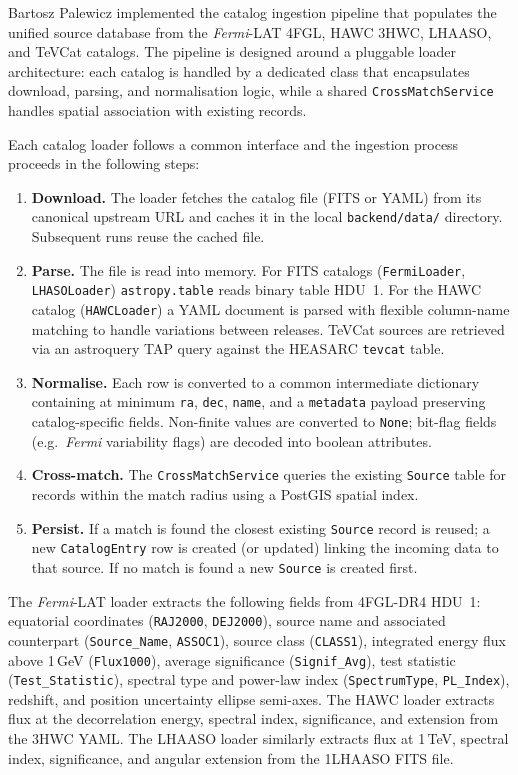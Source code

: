 \documentclass[11pt, a4paper]{article}
\begin{document}
Bartosz Palewicz implemented the catalog ingestion pipeline that populates the unified source database from the \textit{Fermi}-LAT 4FGL, HAWC 3HWC, LHAASO, and TeVCat catalogs.
The pipeline is designed around a pluggable loader architecture: each catalog is handled by a dedicated class that encapsulates download, parsing, and normalisation logic, while a shared \texttt{CrossMatchService} handles spatial association with existing records.

Each catalog loader follows a common interface and the ingestion process proceeds in the following steps:

\begin{enumerate}
    \item \textbf{Download.} The loader fetches the catalog file (FITS or YAML) from its canonical upstream URL and caches it in the local \texttt{backend/data/} directory. Subsequent runs reuse the cached file.
    \item \textbf{Parse.} The file is read into memory. For FITS catalogs (\texttt{FermiLoader}, \texttt{LHASOLoader}) \texttt{astropy.table} reads binary table HDU~1. For the HAWC catalog (\texttt{HAWCLoader}) a YAML document is parsed with flexible column-name matching to handle variations between releases. TeVCat sources are retrieved via an astroquery TAP query against the HEASARC \texttt{tevcat} table.
    \item \textbf{Normalise.} Each row is converted to a common intermediate dictionary containing at minimum \texttt{ra}, \texttt{dec}, \texttt{name}, and a \texttt{metadata} payload preserving catalog-specific fields. Non-finite values are converted to \texttt{None}; bit-flag fields (e.g.\ \textit{Fermi} variability flags) are decoded into boolean attributes.
    \item \textbf{Cross-match.} The \texttt{CrossMatchService} queries the existing \texttt{Source} table for records within the match radius using a PostGIS spatial index.
    \item \textbf{Persist.} If a match is found the closest existing \texttt{Source} record is reused; a new \texttt{CatalogEntry} row is created (or updated) linking the incoming data to that source. If no match is found a new \texttt{Source} is created first.
\end{enumerate}

The \textit{Fermi}-LAT loader extracts the following fields from 4FGL-DR4 HDU~1: equatorial coordinates (\texttt{RAJ2000}, \texttt{DEJ2000}), source name and associated counterpart (\texttt{Source\_Name}, \texttt{ASSOC1}), source class (\texttt{CLASS1}), integrated energy flux above 1\,GeV (\texttt{Flux1000}), average significance (\texttt{Signif\_Avg}), test statistic (\texttt{Test\_Statistic}), spectral type and power-law index (\texttt{SpectrumType}, \texttt{PL\_Index}), redshift, and position uncertainty ellipse semi-axes.
The HAWC loader extracts flux at the decorrelation energy, spectral index, significance, and extension from the 3HWC YAML.
The LHAASO loader similarly extracts flux at 1\,TeV, spectral index, significance, and angular extension from the 1LHAASO FITS file.
\end{document}

